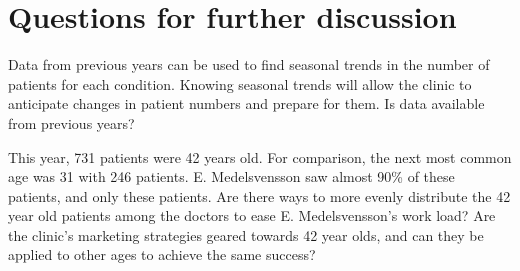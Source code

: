 \section{Questions for further discussion}
Data from previous years can be used to find seasonal trends in the number of patients for each condition. Knowing seasonal trends will allow the clinic to anticipate changes in patient numbers and prepare for them. Is data available from previous years?

This year, 731 patients were 42 years old. For comparison, the next most common age was 31 with 246 patients. E. Medelsvensson saw almost 90\% of these patients, and only these patients. Are there ways to more evenly distribute the 42 year old patients among the doctors to ease E. Medelsvensson's work load? Are the clinic's marketing strategies geared towards 42 year olds, and can they be applied to other ages to achieve the same success?
